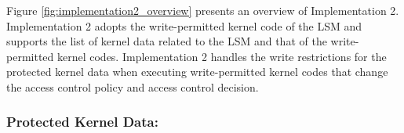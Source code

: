 Figure \ref{fig:implementation2_overview} presents an overview of Implementation
2.
%
Implementation 2 adopts the write-permitted kernel code of the LSM and supports
the list of kernel data related to the LSM and that of the write-permitted
kernel codes.
%
Implementation 2 handles the write restrictions for the protected kernel data when
executing write-permitted kernel codes that change the access control policy and
access control decision.
%



\subsubsection{Protected Kernel Data:}



